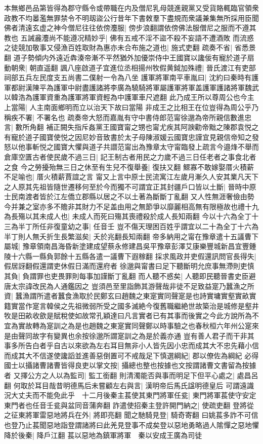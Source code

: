 本無鄉邑品第皆得為郡守縣令或帶職在内及僧尼乳母競進親黨又受貨賂輒臨官領衆政教不均㬥濫無罪禁令不明刼盜公行昔年下書敇羣下盡規而衆議兼集無所採用臣聞佛者清遠玄虚之神今僧尼往往依傍灋服|{
	傍步浪翻謂依傍佛法服僧尼之服而不遵其教也}
五誡麄灋尚不能遵况精妙乎|{
	佛有五戒不淫不盜不殺不妄語不遭酒敗}
而流惑之徒競加敬事又侵漁百姓取財為惠亦未合布施之道也|{
	施式吏翻}
疏奏不省|{
	省悉景翻}
道子勢傾内外遠近犇湊帝漸不平然猶外加優崇侍中王國寶以讒佞有寵於道子扇動朝衆|{
	朝直遥翻}
諷八座啟道子宜進位丞相揚州牧假黄鉞加殊禮|{
	晉氏渡江有吏部祠部五兵左民度支五尚書二僕射一令為八坐}
護軍將軍南平車胤曰|{
	沈約曰秦時有護軍都尉漢陳平為護軍中尉盡護諸將李廣為驍騎將軍屬護軍將軍盖護軍護諸將軍魏武以韓浩為護軍資重為護軍將軍資輕為中護軍車尺遮翻}
此乃成王所以尊周公也今主上當陽|{
	人主南面鄉明而立以治天下故曰當陽}
非成王之比相王在位豈得為周公乎乃稱疾不署|{
	不署名也}
疏奏帝大怒而嘉胤有守中書侍郎范甯徐邈為帝所親信數進忠言|{
	數所角翻}
補正闕失指斥姦黨王國寶甯之甥也甯尤疾其阿諛勸帝黜之陳郡袁悦之有寵於道子國寶使悦之因尼妙音致書於太子母陳淑媛云國寶忠謹宜見親信帝知之發怒以他事斬悦之國寶大懼與道子共譛范甯出為豫章太守甯臨發上疏言今邉烽不舉而倉庫空匱古者使民歲不過三日|{
	記王制古者用民之力歲不過三日任老者之事食北者之食}
今之勞擾殆無三日之休至有生兒不復舉養|{
	復扶又翻}
鰥寡不敢嫁娶厝火積薪不足喻也|{
	厝火積薪賈誼之言}
甯又上言中原士民流寓江左歲月漸久人安其業凡天下之人原其先祖皆隨世遷移何至於今而獨不可謂宜正其封疆戶口皆以土斷|{
	晉時中原士民南渡者皆於江左僑立郡縣以居之不以土著為斷斷丁亂翻}
又人性無涯奢儉由勢今并兼之室亦多不贍非其財力不足盖由用之無節爭以靡麗相高無有限極故也禮十九為長殤以其未成人也|{
	未成人而死曰殤其喪禮殺於成人長知兩翻}
今以十六為全丁十三為半丁所任非復童幼之事|{
	任音壬}
豈不傷天理困百姓乎謂宜以二十為全丁十六為半丁則人無夭折生長繁滋矣|{
	夭於兆翻長知兩翻}
帝多納用之甯在豫章遣十五議曹下屬城|{
	豫章領南昌海昏新塗建成望蔡永修建昌吳平豫章彭澤艾康樂豐城新昌宜豐鍾陵十六縣一縣負郭餘十五縣各遣一議曹下遐稼翻}
採求風政并吏假還訊問官長得失|{
	假居訝翻假還謂吏休假日滿而還府者}
徐邈與甯書曰足下聽斷明允庶事無滯則吏慎其負|{
	負謂罪也吏畏罪則每事加謹斷丁亂翻}
而人聽不惑矣|{
	人聽即民聽晉書史臣避唐太宗諱改民為人通鑑因之}
豈須邑至里詣飾其游聲哉非徒不足致益寔乃蠶漁之所資|{
	蠶漁謂所遣者蠶食漁取於民鄭玄曰趙魏之東寔實同聲寔是也詩實墉實壑實畝實籍實當作寔言韓侯之先祖微弱所受之國多滅絶今復舊職繼絶世故築治是城修是壑井牧是田畝收歛是賦稅使如故常孔穎達曰凡言實者已有其事而後實之今此方說所為不宜為實故轉為寔訓之為是也趙魏之東寔實同聲鄭以時事驗之也春秋桓六年州公寔來是由聲同故字有變異也余按徐邈所謂寔訓之為是於義亦通}
豈有善人君子而干非其事多所告白者乎自古以來欲為左右耳目無非小人皆先因小忠而成其大不忠先藉小信而成其大不信遂使讒謟並進善惡倒置可不戒哉足下慎選綱紀|{
	郡以僚佐為綱紀}
必得國士以攝諸曹諸曹皆得良吏以掌文按|{
	攝總也整也按據也文按謂諸曹文書留為按據者}
又擇公方之人以為監司|{
	監工銜翻}
則清濁能否與事而明足下但平心處之|{
	處昌呂翻}
何取於耳目哉昔明德馬后未嘗顧左右與言|{
	漢明帝后馬氏諡明德皇后}
可謂遠識況大丈夫而不能免此乎　十二月後秦主萇使其東門將軍任瓫|{
	東門將軍萇使守安定東門者也任音壬瓫與盆同音蒲奔翻}
詐遣使招秦主登許開門納之|{
	使疏吏翻}
登將從之征東將軍雷惡地將兵在外|{
	將即亮翻}
聞之馳騎見登|{
	騎奇寄翻}
曰姚萇多詐不可信也登乃止萇聞惡地詣登謂諸將曰此羌見登事不成矣登以惡地勇略過人隂憚之惡地懼降於後秦|{
	降戶江翻}
萇以惡地為鎮軍將軍　秦以安成王廣為司徒


